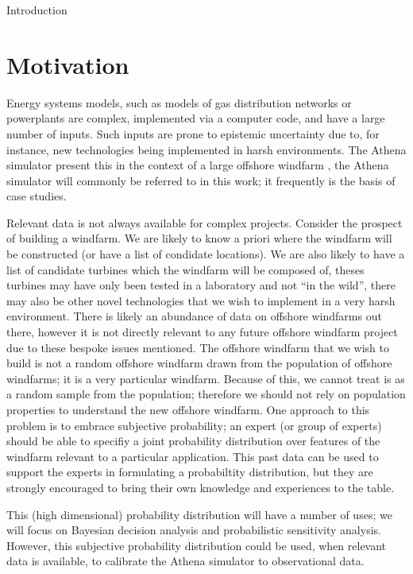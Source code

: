 \begin{chapter}{Introduction \label{Ch:Intro}}

\section{Motivation}

Energy systems models, such as models of gas distribution networks or powerplants are
complex, implemented via a computer code, and have a large number of inputs. Such
inputs are prone to epistemic uncertainty due to, for instance, new technologies being
implemented in harsh environments. The Athena simulator present this in the context of a large offshore windfarm \citep{Zit13, Zit16}, the Athena simulator will commonly be referred to in this work; it frequently is the basis of case studies.

Relevant data is not always available for complex projects. Consider the prospect of building a windfarm. We are likely to know a priori where the windfarm will be constructed (or have a list of condidate locations). We are also likely to have a list of candidate turbines which the windfarm will be composed of, theses turbines may have only been tested in a laboratory and not ``in the wild'', there may also be other novel technologies that we wish to implement in a very harsh environment. There is likely an abundance of data on offshore windfarms out there, however it is not directly relevant to any future offshore windfarm project due to these bespoke issues mentioned. The offshore windfarm that we wish to build is not a random offshore windfarm drawn from the population of offshore windfarms; it is a very particular windfarm. Because of this, we cannot treat is as a random sample from the population; therefore we should not rely on population properties to understand the new offshore windfarm. One approach to this problem is to embrace subjective probability; an expert (or group of experts) should be able to specifiy a joint probability distribution over features of the windfarm relevant to a particular application. This past data can be used to support the experts in formulating a probabiltity distribution, but they are strongly encouraged to bring their own knowledge and experiences to the table.

This (high dimensional) probability distribution will have a number of uses; we will focus on Bayesian decision analysis and probabilistic sensitivity analysis. However, this subjective probability distribution could be used, when relevant data is available, to calibrate the Athena simulator to observational data.







\end{chapter}
